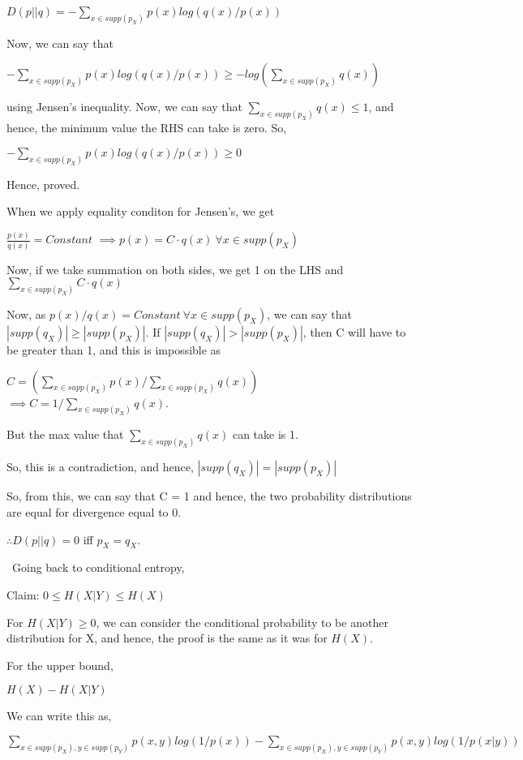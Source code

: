 \documentclass{article}
\begin{document}
$D(p||q) = - \displaystyle\sum_{x\in supp(p_X)}p(x) log(q(x)/p(x))$

Now, we can say that

$-\displaystyle\sum_{x\in supp(p_X)}p(x) log(q(x)/p(x)) \geq -log(\displaystyle\sum_{x\in supp(p_X)}q(x))$

using Jensen's inequality. Now, we can say that $\displaystyle\sum_{x\in supp(p_X)}q(x) \leq 1$, and hence, the minimum value the RHS can take is zero. So,

$-\displaystyle\sum_{x\in supp(p_X)}p(x) log(q(x)/p(x)) \geq 0$

Hence, proved.

When we apply equality conditon for Jensen's, we get

$\frac{p(x)}{q(x)} = Constant$
$\implies p(x) = C\cdot q(x) \ \forall x \in supp(p_X)$

Now, if we take summation on both sides, we get 1 on the LHS and $\displaystyle\sum_{x \in supp(p_X)} C\cdot q(x)$

Now, as $p(x)/q(x) = Constant \ \forall x \in supp(p_X)$, we can say that $|supp(q_X)| \geq |supp(p_X)|$. If $|supp(q_X)| > |supp(p_X)|$, then C will have to be greater than 1, and this is impossible as

$C = \displaystyle(\sum_{x \in supp(p_X)}p(x)/\sum_{x \in supp(p_X)}q(x))$
$\implies C = 1/\displaystyle\sum_{x \in supp(p_X)}q(x)$.

But the max value that $\displaystyle\sum_{x \in supp(p_X)}q(x)$ can take is 1.

So, this is a contradiction, and hence, $|supp(q_X)| = |supp(p_X)|$

So, from this, we can say that C = 1 and hence, the two probability distributions are equal for divergence equal to 0.

$\therefore D(p||q) = 0$ iff $p_X = q_X$.

\
Going back to conditional entropy,

Claim: $0 \leq H(X|Y) \leq H(X)$

For $H(X|Y) \geq 0$, we can consider the conditional probability to be another distribution for X, and hence, the proof is the same as it was for $H(X)$.

For the upper bound,

$H(X) - H(X|Y)$

We can write this as,

$\displaystyle\sum_{x\in supp(p_X), y \in supp(p_Y)}p(x, y) log(1/p(x)) - \displaystyle\sum_{x\in supp(p_X), y \in supp(p_Y)}p(x, y) log(1/p(x|y))$
\end{document}
